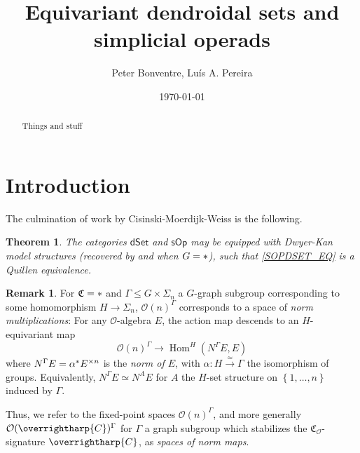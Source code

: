 \documentclass[a4paper,10pt
,draft
]{article}%
\title{Equivariant dendroidal sets and simplicial operads}
\author{Peter Bonventre, Lu\'is A. Pereira}%
\date{\today}
\numberwithin{equation}{section}
\numberwithin{figure}{section}
\newtheorem{theorem}[equation]{Theorem}%
\theoremstyle{definition} %
\newtheorem{remark}[equation]{Remark}%
\newcommand{\set}[1]{\left\{#1\right\}}%
\newcommand{\longto}{\longrightarrow}%
\newcommand{\vect}[1]{\text{\overrightharp{\ensuremath{#1}}}}
\newcommand{\sOp}{\ensuremath{\mathsf{sOp}}}%
\newcommand{\dSet}{\mathsf{dSet}}
\DeclareMathOperator{\Hom}{Hom}%
\renewcommand{\O}{\ensuremath{\mathcal O}}
\newcommand{\1}{\ensuremath{\mathbbm 1}}%
\begin{document}
\maketitle

\begin{abstract}
      Things and stuff
\end{abstract}

\tableofcontents


\section{Introduction}



The culmination of work by Cisinski-Moerdijk-Weiss \cite{CM13a,CM13b,CM11,MW09,MW07} is the following.

\begin{theorem}
      \label{CMW_THM}
      The categories $\dSet$ and $\sOp$ may be equipped with Dwyer-Kan model structures
      (recovered by \cite[Thm. 2.1]{Per18} and \cite[Thm III]{BP_HGOP}  when $G = \**$),
      such that \eqref{SOPDSET_EQ} is a Quillen equivalence.
\end{theorem}


{\color{OliveGreen} %
  \begin{remark}
        For $\mathfrak C = \**$ and $\Gamma \leq G \times \Sigma_n$ a $G$-graph subgroup corresponding to some homomorphism $H \to \Sigma_n$,
        $\O(n)^{\Gamma}$ corresponds to a space of \textit{norm multiplications}:
        For any $\O$-algebra $E$, the action map descends to an $H$-equivariant map
        \[
              \O(n)^{\Gamma} \longto \Hom^H(N^\Gamma E, E)
        \]
        where $N^\Gamma E = \alpha^{\**}E^{\times n}$ is the \textit{norm of $E$}, with $\alpha \colon H \xrightarrow{\simeq} \Gamma$ the isomorphism of groups.
        Equivalently, $N^\Gamma E \simeq N^A E$ for $A$ the $H$-set structure on $\set{1,\dots, n}$ induced by $\Gamma$.

        Thus, we refer to the fixed-point spaces $\O(n)^\Gamma$,
        and more generally $\O(\vect C)^\Gamma$ for $\Gamma$ a graph subgroup which stabilizes the $\mathfrak C_\O$-signature $\vect C$,
        as \textit{spaces of norm maps}.
  \end{remark}
} %
\end{document}
